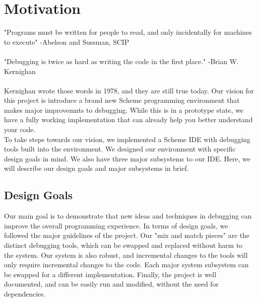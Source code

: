 \documentclass[10pt,journal,compsoc]{IEEEtran}
\begin{document}
		
		\section{Motivation}
		"Programs must be written for people to read, and only incidentally for machines to execute" -Abelson and Sussman, SCIP\\
		\\
		"Debugging is twice as hard as writing the code in the first place." -Brian W. Kernighan\\
        \\
        Kernighan wrote those words in 1978, and they are still true today. Our vision for this project is introduce a brand new Scheme programming environment that makes major improvemnts to debugging. While this is in a prototype state, we have a fully working implementation that can already help you better understand your code.
        \\
        To take steps towards our vision, we implemented a Scheme IDE with debugging tools built into the environment. We designed our environment with specific design goals in mind. We also have three major subsystems to our IDE. Here, we will describe our design goals and major subsystems in brief.
        
        \subsection{Design Goals}
        
        Our main goal is to demonstrate that new ideas and techniques in debugging can improve the overall programming experience. In terms of design goals, we followed the major guidelines of the project. Our "mix and match pieces" are the distinct debugging tools, which can be swapped and replaced without harm to the system. Our system is also robust, and incremental changes to the tools will only require incremental changes to the code. Each major system subsystem can be swapped for a different implementation. Finally, the project is well documented, and can be easily run and modified, without the need for dependencies.
        
\end{document}
